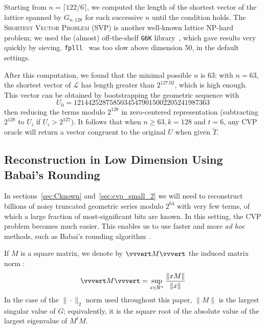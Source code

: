 \documentclass[submission,svgnames,journal=tosc]{iacrtrans}
\begin{document}
Starting from $n=\lceil 122/6\rceil$, we computed the length of the
shortest vector of the lattice spanned by $G_{n, 128}$ for each successive $n$
until the condition holds. The \textsc{Shortest Vector Problem} (SVP) is another
well-known lattice NP-hard problem; we used the (almost) off-the-shelf
\texttt{G6K} library~\cite{AlbrechtDHKPS19}, which gave results very quickly by
sieving. \texttt{fplll}~\cite{fplll} was too slow above dimension 50, in the
default settings.

After this computation, we found that the minimal possible $n$ is 63: with
$n=63$, the shortest vector of $\mathcal{L}$ has length greater than
$2^{127.02}$, which is high enough. This vector can be obtained by bootstrapping
the geometric sequence with
\[
  U_0 = 12144252875850345479015002205241987363
\]
then reducing the terms modulo $2^{128}$ in zero-centered representation
(subtracting $2^{128}$ to $U_i$ if $U_i > 2^{127}$). It follows that when
$n\geq 63, k=128$ and $t=6$, any CVP oracle will return a vector congruent to
the original $U$ when given $\widetilde{T}$.


\subsection{Reconstruction in Low Dimension Using Babai's Rounding}
\label{sec:cvp_small}

In sections~\ref{sec:Cknown} and~\ref{sec:cvp_small_2} we will need to
reconstruct billions of noisy truncated geometric series modulo $2^{64}$ with
very few terms, of which a large fraction of most-significant bits are known. In
this setting, the CVP problem becomes much easier. This enables us to use faster
and more \textit{ad hoc} methods, such as Babai's rounding
algorithm~\cite{Babai86}.

If $M$ is a square matrix, we denote by $\vvvert M \vvvert$ the induced matrix norm :
\[
  \vvvert M \vvvert =  \sup_{x \in \mathbb{R}^n} \frac{\| xM \|}{\| x \|}
\]
In the case of the $\| \cdot \|_2$ norm used throughout this paper, $\| M \|$ is
the largest singular value of $G$; equivalently, it is the square root of the
absolute value of the largest eigenvalue of $M^{t} M$.
\end{document}
